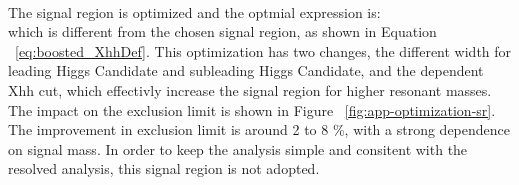 \paragraph{}
The signal region is optimized and the optmial expression is:
\begin{equation}
\end{equation}
which is different from the chosen signal region, as shown in Equation ~\ref{eq:boosted_XhhDef}. This optimization has two changes, the different width for leading Higgs Candidate and subleading Higgs Candidate, and the \pt dependent Xhh cut, which effectivly increase the signal region for higher resonant masses. The impact on the exclusion limit is shown in Figure ~\ref{fig:app-optimization-sr}. The improvement in exclusion limit is around 2 to 8 \%, with a strong dependence on signal mass. In order to keep the analysis simple and consitent with the resolved analysis, this signal region is not adopted.

